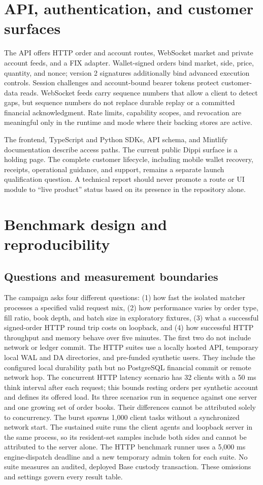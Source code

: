 \documentclass[envcountsame,runningheads,notitlepage]{llncs}
\begin{document}
\section{API, authentication, and customer surfaces}
The API offers HTTP order and account routes, WebSocket market and private account feeds, and a FIX adapter. Wallet-signed orders bind market, side, price, quantity, and nonce; version 2 signatures additionally bind advanced execution controls. Session challenges and account-bound bearer tokens protect customer-data reads. WebSocket feeds carry sequence numbers that allow a client to detect gaps, but sequence numbers do not replace durable replay or a committed financial acknowledgment. Rate limits, capability scopes, and revocation are meaningful only in the runtime and mode where their backing stores are active.\cite{source}

The frontend, TypeScript and Python SDKs, API schema, and Mintlify documentation describe access paths. The current public Dippi surface is a holding page. The complete customer lifecycle, including mobile wallet recovery, receipts, operational guidance, and support, remains a separate launch qualification question. A technical report should never promote a route or UI module to ``live product'' status based on its presence in the repository alone.\cite{staging,m8}

\section{Benchmark design and reproducibility}\label{sec:bench}
\subsection{Questions and measurement boundaries}
The campaign asks four different questions: (1) how fast the isolated matcher processes a specified valid request mix, (2) how performance varies by order type, fill ratio, book depth, and batch size in exploratory fixtures, (3) what a successful signed-order HTTP round trip costs on loopback, and (4) how successful HTTP throughput and memory behave over five minutes. The first two do not include network or ledger commit. The HTTP suites use a locally hosted API, temporary local WAL and DA directories, and pre-funded synthetic users. They include the configured local durability path but no PostgreSQL financial commit or remote network hop. The concurrent HTTP latency scenario has 32 clients with a 50 ms think interval after each request; this bounds resting orders per synthetic account and defines its offered load. Its three scenarios run in sequence against one server and one growing set of order books. Their differences cannot be attributed solely to concurrency. The burst spawns 1,000 client tasks without a synchronized network start. The sustained suite runs the client agents and loopback server in the same process, so its resident-set samples include both sides and cannot be attributed to the server alone. The HTTP benchmark runner uses a 5,000 ms engine-dispatch deadline and a new temporary admin token for each suite. No suite measures an audited, deployed Base custody transaction. These omissions and settings govern every result table.
\end{document}
